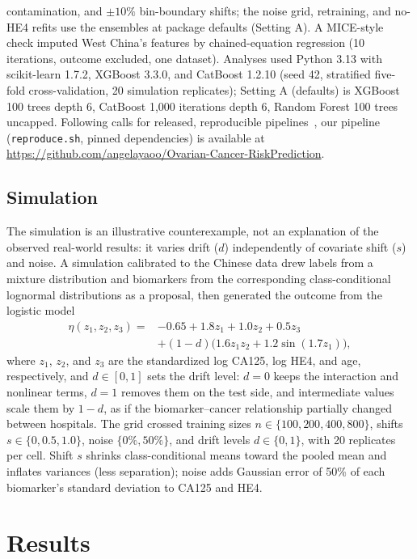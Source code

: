 \documentclass[conference]{IEEEtran}
\begin{document}
contamination, and $\pm10\%$ bin-boundary shifts; the noise grid,
retraining, and no-HE4 refits use the ensembles at package defaults
(Setting A). A MICE-style check imputed West China's features by
chained-equation regression (10 iterations, outcome excluded, one
dataset).
Analyses used Python 3.13 with scikit-learn 1.7.2, XGBoost 3.3.0, and
CatBoost 1.2.10 (seed 42, stratified five-fold
cross-validation, 20 simulation replicates); Setting
A (defaults) is XGBoost 100 trees depth 6, CatBoost 1{,}000
iterations depth 6, Random Forest 100 trees uncapped. Following calls for
released, reproducible pipelines~\cite{roberts2021}, our pipeline
(\texttt{reproduce.sh}, pinned dependencies) is
available at \url{https://github.com/angelayaoo/Ovarian-Cancer-RiskPrediction}.

\subsection{Simulation}

The simulation is an illustrative counterexample, not an explanation
of the observed real-world results: it varies drift ($d$) independently of
covariate shift ($s$) and noise. A simulation calibrated to the Chinese
data drew labels from a mixture distribution and biomarkers from the
corresponding class-conditional lognormal distributions as a proposal,
then generated the outcome from the logistic model
\begin{equation}
\begin{split}
\eta(z_1, z_2, z_3) = {}&-0.65 + 1.8z_1 + 1.0z_2 + 0.5z_3\\
&+ (1-d)\bigl(1.6z_1z_2 + 1.2\sin(1.7z_1)\bigr),
\end{split}
\label{eq:eta}
\end{equation}
where $z_1$, $z_2$, and $z_3$ are the standardized log CA125, log HE4,
and age, respectively, and $d\in[0,1]$ sets the drift level: $d=0$ keeps
the interaction and nonlinear terms, $d=1$ removes them on the
test side, and intermediate values scale them by $1-d$, as if the
biomarker--cancer relationship partially changed between hospitals. The
grid crossed training sizes $n\in\{100,200,400,800\}$, shifts
$s\in\{0,0.5,1.0\}$, noise $\{0\%,50\%\}$, and drift
levels $d\in\{0,1\}$, with
20 replicates per cell. Shift $s$ shrinks class-conditional means toward the pooled mean
and inflates variances (less separation); noise adds Gaussian error
of 50\% of each biomarker's standard deviation to CA125 and HE4.

\section{Results}
\end{document}
